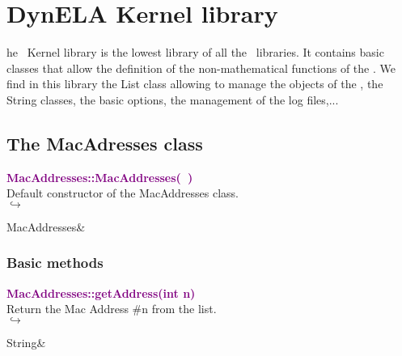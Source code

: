%
%
%
\chapter{DynELA Kernel library}

\startcontents[chapters]
\printmyminitoc[2]he \DynELA~Kernel library is the lowest library of all the \DynELA~libraries. It contains basic classes that allow the definition of the non-mathematical functions of the \DynELA. We find in this library the List class allowing to manage the objects of the \DynELA, the String classes, the basic options, the management of the log files,...

\section{The MacAdresses class}



\textcolor{purple}{\textbf{MacAddresses::MacAddresses(~)}}\label{MacAddresses::MacAddresses()}\\
Default constructor of the MacAddresses class.\\ \hspace*{5mm}$\hookrightarrow$
\vspace*{-2em}\begin{tcolorbox}[grow to left by=-1cm, width=\textwidth-1cm,myArgs,tabularx={l|R}]
MacAddresses&
\end{tcolorbox}


\subsection{Basic methods}

\textcolor{purple}{\textbf{MacAddresses::getAddress(int n)}}\label{MacAddresses::getAddress(int n)}\\
Return the Mac Address \#n from the list.\\ \hspace*{5mm}$\hookrightarrow$
\vspace*{-2em}\begin{tcolorbox}[grow to left by=-1cm, width=\textwidth-1cm,myArgs,tabularx={l|R}]
String&
\end{tcolorbox}

